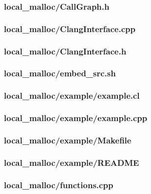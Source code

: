 \documentclass{article}
\begin{document}
\subsubsection*{local\_malloc/CallGraph.h}


\subsubsection*{local\_malloc/ClangInterface.cpp}


\subsubsection*{local\_malloc/ClangInterface.h}


\subsubsection*{local\_malloc/embed\_src.sh}


\subsubsection*{local\_malloc/example/example.cl}


\subsubsection*{local\_malloc/example/example.cpp}


\subsubsection*{local\_malloc/example/Makefile}


\subsubsection*{local\_malloc/example/README}


\subsubsection*{local\_malloc/functions.cpp}

\end{document}
